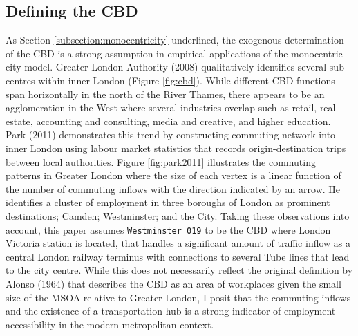 \documentclass{article}
\begin{document}
\subsection{Defining the CBD}\label{subsection:CBD}
As Section \ref{subsection:monocentricity} underlined, the exogenous determination of the CBD is a strong assumption in empirical applications of the monocentric city model.  Greater London Authority (2008) qualitatively identifies several sub-centres within inner London (Figure \ref{fig:cbd}). While different CBD functions span horizontally in the north of the River Thames, there appears to be an agglomeration in the West where several industries overlap such as retail, real estate, accounting and consulting, media and creative, and higher education. Park (2011) demonstrates this trend by constructing commuting network into inner London using labour market statistics that records origin-destination trips between local authorities. Figure \ref{fig:park2011} illustrates the commuting patterns in Greater London where the size of each vertex is a linear function of the number of commuting inflows with the direction indicated by an arrow. He identifies a cluster of employment in three boroughs of London as prominent destinations; Camden; Westminster; and the City. Taking these observations into account, this paper assumes  \texttt{Westminster 019}  to be the CBD where London Victoria station is located, that handles a significant amount of traffic inflow as a central London railway terminus with connections to several Tube lines that lead to the city centre. While this does not necessarily reflect the original definition by Alonso (1964) that describes the CBD as an area of workplaces given the small size of the MSOA relative to Greater London, I posit that the commuting inflows and the existence of a transportation hub is a strong indicator of employment accessibility in the modern metropolitan context.
\end{document}
